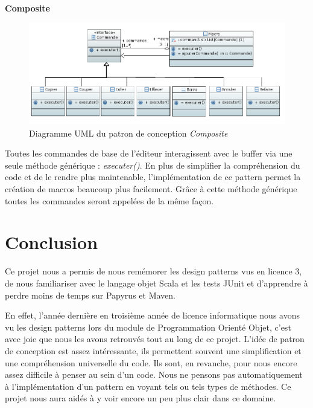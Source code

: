\documentclass[a4paper,11pt]{article}
\begin{document}
\clearpage

%
%

\large{\textbf{Composite}}

\begin{figure}[h!]
   \centerline{\includegraphics[scale=0.7]{DiagrammeComposite.png}}
   \caption{\label{diaComposite} Diagramme UML du patron de conception \emph{Composite}}
\end{figure}

\vspace{2cm}
\noindent Toutes les commandes de base de l'éditeur interagissent avec le buffer via une seule méthode générique : \textit{executer()}. En plus de simplifier la compréhension du code et de le rendre plus maintenable, l'implémentation de ce pattern permet la création de macros beaucoup plus facilement. Grâce à cette méthode générique toutes les commandes seront appelées de la même façon.

\clearpage

%
%

\section{Conclusion}\label{sec:conclusion}
\bigskip

Ce projet nous a permis de nous remémorer les design patterns vus en licence 3, de nous familiariser avec le langage objet Scala et les tests JUnit et d'apprendre à perdre moins de temps sur Papyrus et Maven.
\bigskip

\noindent En effet, l'année dernière en troisième année de licence informatique nous avons vu les design patterns lors du module de Programmation Orienté Objet, c'est avec joie que nous les avons retrouvés tout au long de ce projet. L'idée de patron de conception est assez intéressante, ils permettent souvent une simplification et une compréhension universelle du code. Ils sont, en revanche, pour nous encore assez difficile à penser au sein d'un code. Nous ne pensons pas automatiquement à l'implémentation d'un pattern en voyant tels ou tels types de méthodes. Ce projet nous aura aidés à y voir encore un peu plus clair dans ce domaine.
\bigskip
\end{document}
